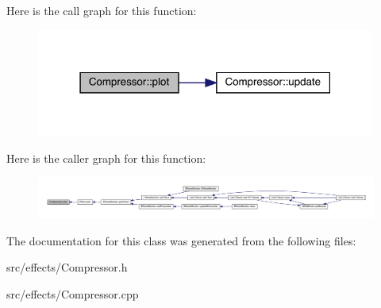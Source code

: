 Here is the call graph for this function\+:
\nopagebreak
\begin{figure}[H]
\begin{center}
\leavevmode
\includegraphics[width=316pt]{class_compressor_a57e231b206c612382a6cf4c348868838_cgraph}
\end{center}
\end{figure}
Here is the caller graph for this function\+:
\nopagebreak
\begin{figure}[H]
\begin{center}
\leavevmode
\includegraphics[width=350pt]{class_compressor_a57e231b206c612382a6cf4c348868838_icgraph}
\end{center}
\end{figure}


The documentation for this class was generated from the following files\+:\begin{DoxyCompactItemize}
\item 
src/effects/Compressor.\+h\item 
src/effects/Compressor.\+cpp\end{DoxyCompactItemize}
